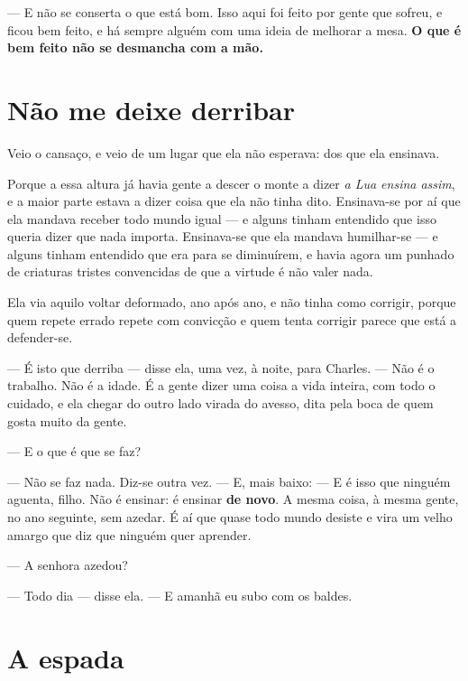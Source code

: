 \documentclass[livro.tex]{subfiles}
\begin{document}
--- E não se conserta o que está bom. Isso aqui foi feito por gente que sofreu, e ficou bem
feito, e há sempre alguém com uma ideia de melhorar a mesa. \textbf{O que é bem feito não se
desmancha com a mão.}

\section{Não me deixe derribar}

Veio o cansaço, e veio de um lugar que ela não esperava: dos que ela ensinava.

\medskip

Porque a essa altura já havia gente a descer o monte a dizer \emph{a Lua ensina assim}, e a
maior parte estava a dizer coisa que ela não tinha dito. Ensinava-se por aí que ela mandava
receber todo mundo igual --- e alguns tinham entendido que isso queria dizer que nada importa.
Ensinava-se que ela mandava humilhar-se --- e alguns tinham entendido que era para se
diminuírem, e havia agora um punhado de criaturas tristes convencidas de que a virtude é não
valer nada.

Ela via aquilo voltar deformado, ano após ano, e não tinha como corrigir, porque quem repete
errado repete com convicção e quem tenta corrigir parece que está a defender-se.

\medskip

--- É isto que derriba --- disse ela, uma vez, à noite, para Charles. --- Não é o trabalho. Não é
a idade. É a gente dizer uma coisa a vida inteira, com todo o cuidado, e ela chegar do outro lado
virada do avesso, dita pela boca de quem gosta muito da gente.

--- E o que é que se faz?

--- Não se faz nada. Diz-se outra vez. --- E, mais baixo: --- E é isso que ninguém aguenta, filho.
Não é ensinar: é ensinar \textbf{de novo}. A mesma coisa, à mesma gente, no ano seguinte, sem
azedar. É aí que quase todo mundo desiste e vira um velho amargo que diz que ninguém quer
aprender.

--- A senhora azedou?

--- Todo dia --- disse ela. --- E amanhã eu subo com os baldes.

\section{A espada}
\end{document}
